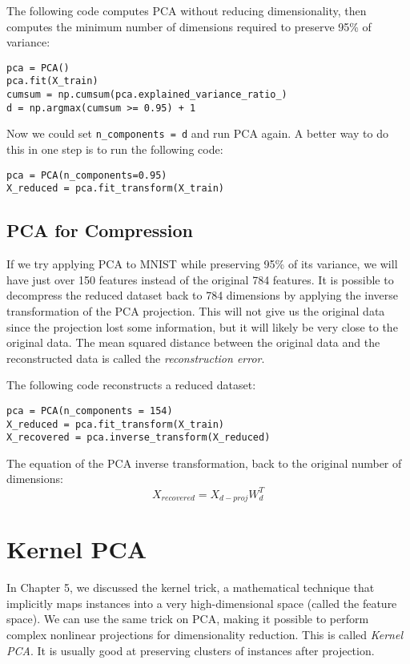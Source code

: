 \documentclass[letterpaper]{article}
\begin{document}
The following code computes PCA without reducing dimensionality, then computes the minimum number of dimensions required to preserve 95\% of variance: 
\begin{verbatim}
pca = PCA()
pca.fit(X_train)
cumsum = np.cumsum(pca.explained_variance_ratio_)
d = np.argmax(cumsum >= 0.95) + 1
\end{verbatim}

Now we could set \texttt{n\_components = d} and run PCA again. A better way to do this in one step is to run the following code: 
\begin{verbatim}
pca = PCA(n_components=0.95)
X_reduced = pca.fit_transform(X_train)
\end{verbatim}

\subsection{PCA for Compression} 
If we try applying PCA to MNIST while preserving 95\% of its variance, we will have just over 150 features instead of the original 784 features. It is possible to decompress the reduced dataset back to 784 dimensions by applying the inverse transformation of the PCA projection. This will not give us the original data since the projection lost some information, but it will likely be very close to the original data. The mean squared distance between the original data and the reconstructed data is called the \textsl{reconstruction error}. 

The following code reconstructs a reduced dataset: 
\begin{verbatim}
pca = PCA(n_components = 154)
X_reduced = pca.fit_transform(X_train)
X_recovered = pca.inverse_transform(X_reduced)
\end{verbatim}

The equation of the PCA inverse transformation, back to the original number of dimensions: 
$$ X_{recovered} = X_{d-proj}W_{d}^{T} $$

\section{Kernel PCA}
In Chapter 5, we discussed the kernel trick, a mathematical technique that implicitly maps instances into a very high-dimensional space (called the feature space). We can use the same trick on PCA, making it possible to perform complex nonlinear projections for dimensionality reduction. This is called \textsl{Kernel PCA}. It is usually good at preserving clusters of instances after projection. 
\end{document}
